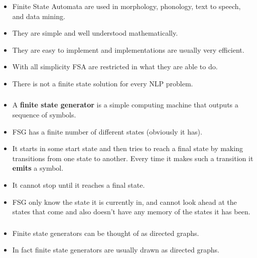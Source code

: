 \begin{frame}

	\frametitle{\insertsection}
	\framesubtitle{\insertsubsection}
	
	\begin{itemize}
		\item Finite State Automata are used in morphology, phonology, text to speech, and data mining.
		\item They are simple and well understood mathematically.
		\item They are easy to implement and implementations are usually very efficient.
		\item With all simplicity FSA are restricted in what they are able to do.
		\item There is not a finite state solution for every NLP problem.
	\end{itemize}

\end{frame}

\begin{frame}

	\frametitle{\insertsection}
	\framesubtitle{\insertsubsection}
	
	\begin{itemize}
		\item A \textbf{finite state generator} is a simple computing machine that outputs a sequence of symbols.
		\item FSG has a finite number of different states (obviously it has).
		\item It starts in some start state and then tries to reach a final state by making transitions from one state to another. Every time it makes such a transition it \textbf{emits} a symbol.
		\item It cannot stop until it reaches a final state.
		\item FSG only know the state it is currently in, and cannot look ahead at the states that come and also doesn't have any memory of the states it has been.
	\end{itemize}
	
\end{frame}


\begin{frame}

	\frametitle{\insertsection}
	\framesubtitle{\insertsubsection}
	
	\begin{itemize}
		\item Finite state generators can be thought of as directed graphs.
		\item In fact finite state generators are usually drawn as directed graphs.
	\end{itemize}

\end{frame}


